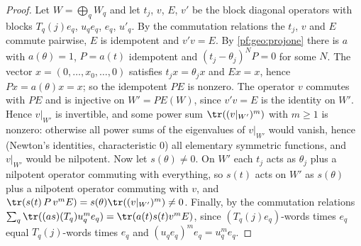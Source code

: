 \begin{proof}
Let $W=\bigoplus_qW_q$ and let $t_j$, $v$, $E$, $v'$ be the block diagonal operators with blocks $T_q(j)e_q$, $u_qe_q$, $e_q$, $u'_q$. By the
commutation relations the $t_j$, $v$ and $E$ commute pairwise, $E$ is idempotent and $v'v=E$. By \cref{pf:geo:projone} there is $a$ with
$a(\theta)=1$, $P=a(t)$ idempotent and $(t_j-\theta_j)^NP=0$ for some $N$. The vector $x=(0,\dots,x_0,\dots,0)$ satisfies $t_jx=\theta_jx$ and
$Ex=x$, hence $Px=a(\theta)x=x$; so the idempotent $PE$ is nonzero. The operator $v$ commutes with $PE$ and is injective on $W'=PE(W)$,
since $v'v=E$ is the identity on $W'$. Hence $v|_{W'}$ is invertible, and some power sum $\tr((v|_{W'})^m)$ with $m\ge1$ is nonzero: otherwise
all power sums of the eigenvalues of $v|_{W'}$ would vanish, hence (Newton's identities, characteristic $0$) all elementary symmetric
functions, and $v|_{W'}$ would be nilpotent. Now let $s(\theta)\ne0$. On $W'$ each $t_j$ acts as $\theta_j$ plus a nilpotent operator commuting with
everything, so $s(t)$ acts on $W'$ as $s(\theta)$ plus a nilpotent operator commuting with $v$, and
$\tr(s(t)\,P\,v^mE)=s(\theta)\tr((v|_{W'})^m)\ne0$. Finally, by the commutation relations
$\sum_q\tr((as)(T_q)u_q^me_q)=\tr(a(t)s(t)v^mE)$, since $(T_q(j)e_q)$-words times $e_q$ equal $T_q(j)$-words times $e_q$ and
$(u_qe_q)^me_q=u_q^me_q$.
\end{proof}

